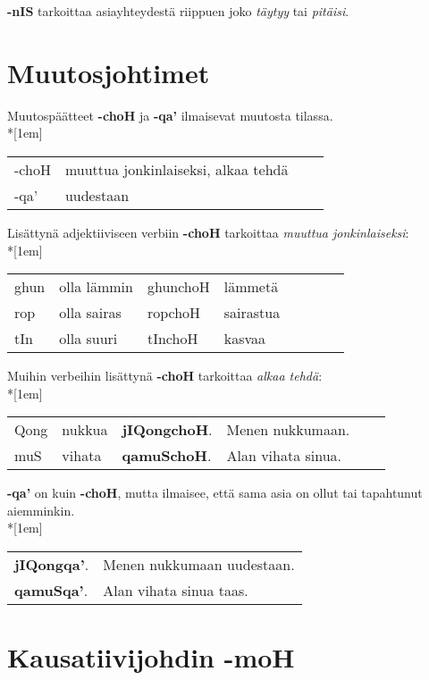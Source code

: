 \documentclass{book}
\begin{document}
\textbf{-nIS} tarkoittaa asiayhteydestä riippuen joko \textit{täytyy} tai \textit{pitäisi}.

\section{Muutosjohtimet}

Muutospäätteet \textbf{-choH} ja \textbf{-qa'} ilmaisevat muutosta tilassa.\\*[1em]
\begin{tabular}{Bl Il}
    -choH & muuttua jonkinlaiseksi, alkaa tehdä \\
    -qa' & uudestaan \\
\end{tabular}

Lisättynä adjektiiviseen verbiin \textbf{-choH} tarkoittaa \textit{muuttua jonkinlaiseksi}:\\*[1em]
\begin{tabular}{Bl Il | Bl Il}
    ghun & olla lämmin & ghunchoH & lämmetä \\
    rop & olla sairas & ropchoH & sairastua \\
    tIn & olla suuri & tInchoH & kasvaa \\
\end{tabular}

Muihin verbeihin lisättynä \textbf{-choH} tarkoittaa \textit{alkaa tehdä}:\\*[1em]
\begin{tabular}{Bl Il | l l}
    Qong & nukkua & \textbf{jIQongchoH}. & Menen nukkumaan. \\
    muS & vihata & \textbf{qamuSchoH}. & Alan vihata sinua. \\
\end{tabular}

\textbf{-qa'} on kuin \textbf{-choH}, mutta ilmaisee, että sama asia on ollut tai tapahtunut aiemminkin.\\*[1em]
\begin{tabular}{l l}
    \textbf{jIQongqa'}. & Menen nukkumaan uudestaan. \\
    \textbf{qamuSqa'}. & Alan vihata sinua taas. \\
\end{tabular}

\section{Kausatiivijohdin -moH}
\end{document}
